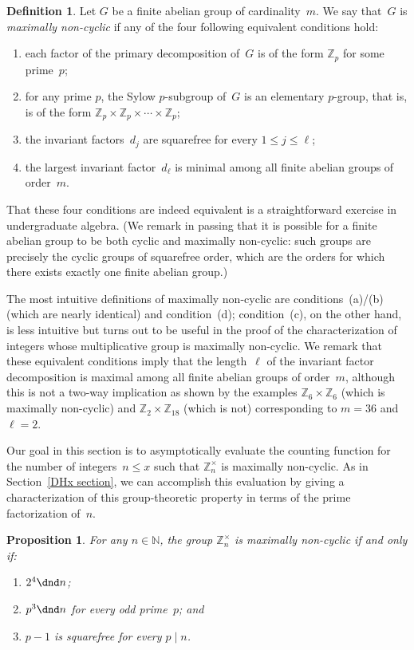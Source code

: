 \documentclass[12pt,reqno]{amsart}
\newtheorem{proposition}[theorem]{Proposition}
\theoremstyle{definition}
\newtheorem{definition}[theorem]{Definition}
\newcommand{\N}{{\mathbb N}}
\newcommand{\Z}{{\mathbb Z}}
\begin{document}
\begin{definition} \label {mncdef}
Let $G$ be a finite abelian group of cardinality~$m$. We say that~$G$ is \textit{maximally non-cyclic} if any of the four following equivalent conditions hold:
\begin{enumerate}
\item each factor of the primary decomposition of~$G$ is of the form $\Z_p$ for some prime~$p$;
\item for any prime $p$, the Sylow $p$-subgroup of~$G$ is an elementary $p$-group, that is, is of the form $\Z_p\times \Z_p\times\cdots \times\Z_p$;
\item the invariant factors~$d_j$ are squarefree for every $1\le j\le \ell$;
\item the largest invariant factor~$d_\ell$ is minimal among all finite abelian groups of order~$m$.
\end{enumerate}
That these four conditions are indeed equivalent is a straightforward exercise in undergraduate algebra. (We remark in passing that it is possible for a finite abelian group to be both cyclic and maximally non-cyclic: such groups are precisely the cyclic groups of squarefree order, which are the orders for which there exists exactly one finite abelian group.)
\end{definition}

The most intuitive definitions of maximally non-cyclic are conditions~(a)/(b) (which are nearly identical) and condition~(d); condition~(c), on the other hand, is less intuitive but turns out to be useful in the proof of the characterization of integers whose multiplicative group is maximally non-cyclic.
We remark that these equivalent conditions imply that the length~$\ell$ of the invariant factor decomposition is maximal among all finite abelian groups of order~$m$, although this is not a two-way implication as shown by the examples $\Z_6\times \Z_6$ (which is maximally non-cyclic) and $\Z_2\times \Z_{18}$ (which is not) corresponding to $m=36$ and $\ell=2$.

Our goal in this section is to asymptotically evaluate the counting function for the number of integers~$n\le x$ such that $\Z_n^\times$ is maximally non-cyclic. As in Section~\ref{DHx section}, we can accomplish this evaluation by giving a characterization of this group-theoretic property in terms of the prime factorization of~$n$.

\begin{proposition} \label{max non cyc characterization prop}
For any $n\in \N$, the group $\Z_n^\times$ is maximally non-cyclic if and only if:
\begin{enumerate}
\item $2^4\dnd n$;
\item $p^3\dnd n$ for every odd prime~$p$; and
\item $p-1$ is squarefree for every $p\mid n$.
\end{enumerate}
\end{proposition}
\end{document}
